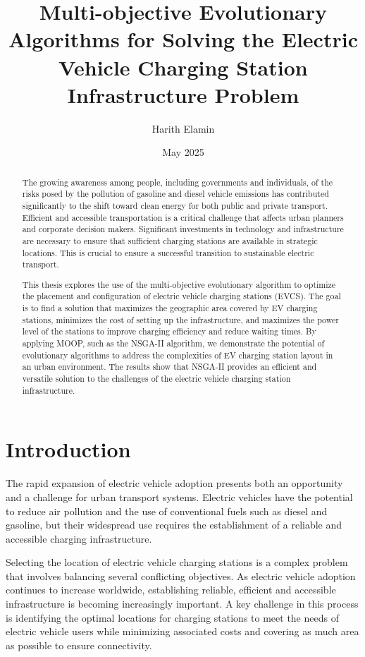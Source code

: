 \documentclass[12pt]{report}
\title{Multi-objective Evolutionary Algorithms for Solving the Electric Vehicle Charging Station Infrastructure Problem}
\author{Harith Elamin}
\date{May 2025}
\begin{document}
\maketitle

\tableofcontents
\newpage

\begin{abstract}
The growing awareness among people, including governments and individuals, of the risks posed by the pollution of gasoline and diesel vehicle emissions has contributed significantly to the shift toward clean energy for both public and private transport. Efficient and accessible transportation is a critical challenge that affects urban planners and corporate decision makers. Significant investments in technology and infrastructure are necessary to ensure that sufficient charging stations are available in strategic locations. This is crucial to ensure a successful transition to sustainable electric transport.

This thesis explores the use of the multi-objective evolutionary algorithm to optimize the placement and configuration of electric vehicle charging stations (EVCS). The goal is to find a solution that maximizes the geographic area covered by EV charging stations, minimizes the cost of setting up the infrastructure, and maximizes the power level of the stations to improve charging efficiency and reduce waiting times. By applying MOOP, such as the NSGA-II algorithm, we demonstrate the potential of evolutionary algorithms to address the complexities of EV charging station layout in an urban environment. The results show that NSGA-II provides an efficient and versatile solution to the challenges of the electric vehicle charging station infrastructure.
\end{abstract}

\chapter{Introduction}
The rapid expansion of electric vehicle adoption presents both an opportunity and a challenge for urban transport systems. Electric vehicles have the potential to reduce air pollution and the use of conventional fuels such as diesel and gasoline, but their widespread use requires the establishment of a reliable and accessible charging infrastructure.

Selecting the location of electric vehicle charging stations is a complex problem that involves balancing several conflicting objectives. As electric vehicle adoption continues to increase worldwide, establishing reliable, efficient and accessible infrastructure is becoming increasingly important. A key challenge in this process is identifying the optimal locations for charging stations to meet the needs of electric vehicle users while minimizing associated costs and covering as much area as possible to ensure connectivity.
\end{document}
